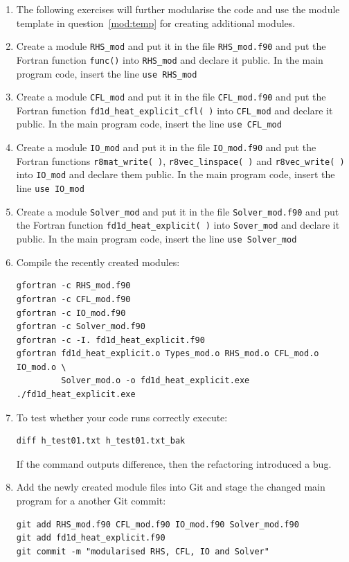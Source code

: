 \documentclass[12pt]{article}
\begin{document}
\begin{enumerate}
\begin{verbatim}
\end{verbatim}
\item[] The following exercises will further modularise the code and use the module template in
  question~\ref{mod:temp} for creating additional modules.
\item Create a module \texttt{RHS\_mod} and put it in the file \texttt{RHS\_mod.f90} and put the 
Fortran function \texttt{func()} into \texttt{RHS\_mod} and declare it public. In the main program code, 
insert the line \texttt{use RHS\_mod} 
\item Create a module \texttt{CFL\_mod} and put it in the file \texttt{CFL\_mod.f90} and put the
  Fortran function \texttt{fd1d\_heat\_explicit\_cfl( )} into \texttt{CFL\_mod} and declare it
  public. In the main program
code, insert the line \texttt{use CFL\_mod}
\item Create a module \texttt{IO\_mod} and put it in the file \texttt{IO\_mod.f90} and put
  the Fortran functions \texttt{r8mat\_write( )}, \texttt{r8vec\_linspace( )} and \texttt{r8vec\_write( )}
  into \texttt{IO\_mod} and declare them public. In the main program code, insert the line \texttt{use IO\_mod}
\item Create a module \texttt{Solver\_mod} and put it in the file \texttt{Solver\_mod.f90} and put the
  Fortran function \texttt{fd1d\_heat\_explicit( )} into \texttt{Sover\_mod} and declare it public. In the main
  program code, insert the line \texttt{use Solver\_mod}
\item Compile the recently created modules:
\begin{verbatim}
gfortran -c RHS_mod.f90
gfortran -c CFL_mod.f90
gfortran -c IO_mod.f90
gfortran -c Solver_mod.f90
gfortran -c -I. fd1d_heat_explicit.f90
gfortran fd1d_heat_explicit.o Types_mod.o RHS_mod.o CFL_mod.o IO_mod.o \
         Solver_mod.o -o fd1d_heat_explicit.exe
./fd1d_heat_explicit.exe
\end{verbatim}
\item To test whether your code runs correctly execute:
\begin{verbatim}
diff h_test01.txt h_test01.txt_bak
\end{verbatim}
If the command outputs difference, then the refactoring introduced a bug.
\item Add the newly created module files into Git and stage the changed main program for a
another Git commit:
\begin{verbatim}
git add RHS_mod.f90 CFL_mod.f90 IO_mod.f90 Solver_mod.f90
git add fd1d_heat_explicit.f90
git commit -m "modularised RHS, CFL, IO and Solver"
\end{verbatim}
%
\end{enumerate}
\newpage
\end{document}
